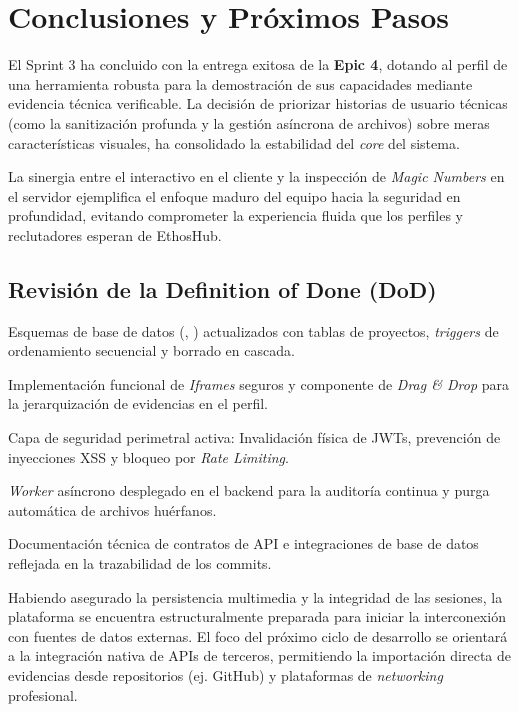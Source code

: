 \section{Conclusiones y Próximos Pasos}
\label{sec:conclusiones_sprint3}

El Sprint 3 ha concluido con la entrega exitosa de la \textbf{Epic 4}, dotando al perfil de una herramienta robusta para la demostración de sus capacidades mediante evidencia técnica verificable. La decisión de priorizar historias de usuario técnicas (como la sanitización profunda y la gestión asíncrona de archivos) sobre meras características visuales, ha consolidado la estabilidad del \textit{core} del sistema.

La sinergia entre el  interactivo en el cliente y la inspección de \textit{Magic Numbers} en el servidor ejemplifica el enfoque maduro del equipo hacia la seguridad en profundidad, evitando comprometer la experiencia fluida que los perfiles y reclutadores esperan de EthosHub.

\subsection{Revisión de la Definition of Done (DoD)}
\begin{ChecklistDoD}
    \item Esquemas de base de datos (, ) actualizados con tablas de proyectos, \textit{triggers} de ordenamiento secuencial y borrado en cascada.
    \item Implementación funcional de \textit{Iframes} seguros y componente de \textit{Drag \& Drop} para la jerarquización de evidencias en el perfil.
    \item Capa de seguridad perimetral activa: Invalidación física de JWTs, prevención de inyecciones XSS y bloqueo por \textit{Rate Limiting}.
    \item \textit{Worker} asíncrono desplegado en el backend para la auditoría continua y purga automática de archivos huérfanos.
    \item Documentación técnica de contratos de API e integraciones de base de datos reflejada en la trazabilidad de los commits.
\end{ChecklistDoD}

Habiendo asegurado la persistencia multimedia y la integridad de las sesiones, la plataforma se encuentra estructuralmente preparada para iniciar la interconexión con fuentes de datos externas. El foco del próximo ciclo de desarrollo se orientará a la integración nativa de APIs de terceros, permitiendo la importación directa de evidencias desde repositorios (ej. GitHub) y plataformas de \textit{networking} profesional.
